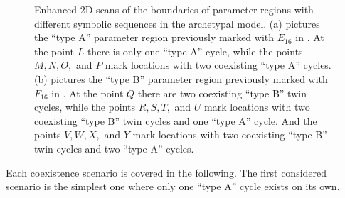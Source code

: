 \begin{figure}
	\centering
	\caption[Enhanced 2D scans of the boundaries of parameter regions with different symbolic sequences in the archetypal model]{
		Enhanced 2D scans of the boundaries of parameter regions with different symbolic sequences in the archetypal model.
		(a) pictures the ``type A'' parameter region previously marked with $E_{16}$ in .
		At the point $L$ there is only one ``type A'' cycle, while the points $M, N, O,$ and $P$ mark locations with two coexisting ``type A'' cycles.
		(b) pictures the ``type B'' parameter region previously marked with $F_{16}$ in .
		At the point $Q$ there are two coexisting ``type B'' twin cycles, while the points $R, S, T,$ and $U$ mark locations with two coexisting ``type B'' twin cycles and one ``type A'' cycle.
		And the points $V, W, X,$ and $Y$ mark locations with two coexisting ``type B'' twin cycles and two ``type A'' cycles.
	}
	\label{fig:arch.coex.regions}
\end{figure}

Each coexistence scenario is covered in the following.
The first considered scenario is the simplest one where only one ``type A'' cycle exists on its own.


